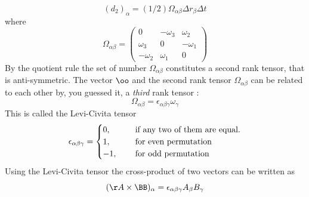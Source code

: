 \begin{subappendices}
\begin{equation}
(d_2)_{\alpha} = (1/2)\Omega_{\alpha\beta} \Delta r_{\beta} \Delta t
\end{equation}
where  
\begin{equation}
\Omega_{\alpha\beta} = 
\begin{pmatrix}
0 & -\omega_3  & \omega_2 \\
\omega_3 & 0 & -\omega_1 \\
-\omega_2  & \omega_1 & 0 
\end{pmatrix}
\end{equation}
By the quotient rule the set of number $\Omega_{\alpha\beta}$ 
constitutes a second rank tensor, that is anti-symmetric. 
The vector $\oo$ and the second rank tensor $\Omega_{\alpha\beta}$ 
can be related to each other by, you guessed it, a \textit{third} rank
tensor :
\begin{equation}
\Omega_{\alpha\beta} = \epsilon_{\alpha\beta\gamma}\omega_{\gamma}
\end{equation}
This is called  the Levi-Civita tensor
\begin{equation}
\epsilon_{\alpha\beta\gamma} =
\begin{cases}
 0 \/,&\quad \text{ if any two of them are equal.} \\
1 \/,&\quad \text{ for even permutation} \\
-1 \/,& \quad \text{ for odd permutation}   
\end{cases} 
\end{equation}
Using the  Levi-Civita tensor the cross-product of two vectors can be
written as
\begin{equation}
(\AA\times\BB)_{\alpha} = \epsilon_{\alpha\beta\gamma}A_{\beta}B_{\gamma}
\end{equation}
\end{subappendices}
